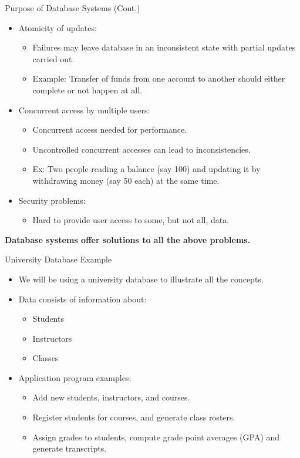 \documentclass{beamer}
\begin{document}
\begin{frame}{Purpose of Database Systems (Cont.)}
    \begin{itemize}
        \item Atomicity of updates:
        \begin{itemize}
            \item Failures may leave database in an inconsistent state with partial updates carried out.
            \item Example: Transfer of funds from one account to another should either complete or not happen at all.
        \end{itemize}
        \item Concurrent access by multiple users:
        \begin{itemize}
            \item Concurrent access needed for performance.
            \item Uncontrolled concurrent accesses can lead to inconsistencies.
            \item Ex: Two people reading a balance (say 100) and updating it by withdrawing money (say 50 each) at the same time.
        \end{itemize}
        \item Security problems:
        \begin{itemize}
            \item Hard to provide user access to some, but not all, data.
        \end{itemize}
    \end{itemize}
    \vspace{5mm}
    \centering
    \textbf{Database systems offer solutions to all the above problems.}
\end{frame}

\begin{frame}{University Database Example}
    \begin{itemize}
        \item We will be using a university database to illustrate all the concepts.
        \item Data consists of information about:
        \begin{itemize}
            \item Students
            \item Instructors
            \item Classes
        \end{itemize}
        \item Application program examples:
        \begin{itemize}
            \item Add new students, instructors, and courses.
            \item Register students for courses, and generate class rosters.
            \item Assign grades to students, compute grade point averages (GPA) and generate transcripts.
        \end{itemize}
    \end{itemize}
\end{frame}
\end{document}
